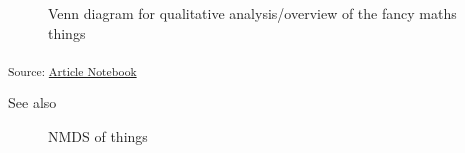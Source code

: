 \documentclass[
]{agujournal2019}
\begin{document}
\begin{figure}[H]


\caption{\label{fig-venn}Venn diagram for qualitative analysis/overview
of the fancy maths things}

\end{figure}%

\textsubscript{Source:
\href{https://BecksLab.github.io/ms_t_is_for_topology/index.qmd.html}{Article
Notebook}}

See also

\begin{figure}[H]


\caption{\label{fig-nmds}NMDS of things}

\end{figure}%
\end{document}
